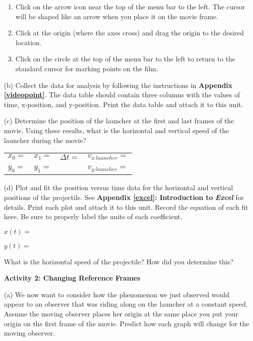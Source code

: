 \begin{enumerate}
\item Click on the arrow icon near the top of the menu bar to the left.
The cursor will be shaped like an arrow when you place it on the movie
frame.
\item Click at the origin (where the axes cross) and drag the origin to
the desired location.
\item Click on the circle at the top of the menu bar to the left to return
to the standard cursor for marking points on the film.
\end{enumerate}
(b) Collect the data for analysis by following the instructions in
\textbf{Appendix \ref{videopoint}}. The data table should contain three columns with
the values of time, x-position, and y-position. Print the data table
and attach it to this unit.

(c) Determine the position of the launcher at the first and last frames
of the movie. Using these results, what is the horizontal and vertical
speed of the launcher during the movie?

\vspace{0.3cm}
{\centering \begin{tabular}{p{20mm}p{20mm}p{30mm}p{70mm}}
\( x_{0}= \) &
\( x_{1}= \)&
\( \Delta t= \)&
\( v_{x\ launcher}= \) \\
&
&
&
\\
\( y_{0}= \)&
\( y_{1}= \) &
&
\( v_{y\ launcher} =\) \\
\end{tabular}\par}
\vspace{0.3cm}

(d) Plot and fit the position versus time data for the horizontal
and vertical positions of the projectile. See \textbf{Appendix \ref{excel}:
Introduction to} \textbf{\emph{Excel}} for details. Print each
plot and attach it to this unit. Record the equation of each fit here.
Be sure to properly label the units of each coefficient.

$x(t) =$
\vspace*{5mm}

$y(t) =$
\vspace{5mm}

What is the horizontal speed of the projectile? How did you determine
this?
\vspace{2in}

\textbf{Activity 2: Changing Reference Frames}

(a) We now want to consider how the phenomenon we just observed would
appear to an observer that was riding along on the launcher at a constant
speed. Assume the moving observer places her origin at the same place
you put your origin on the first frame of the movie. Predict how each
graph will change for the moving observer.

